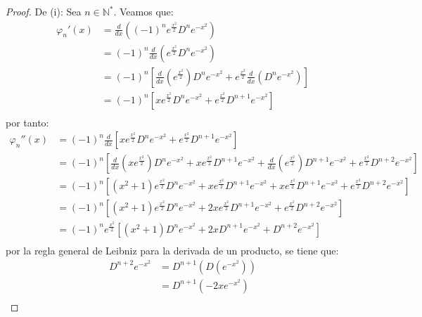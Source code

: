 \documentclass[12pt]{report}
\newcounter{it}
\theoremstyle{largebreak}
\begin{document}
    \begin{proof}
        De (i): Sea $n\in\mathbb{N}^*$. Veamos que:
        \begin{equation*}
            \begin{split}
                \varphi_n'(x)
                &=\frac{d}{dx}\left((-1)^ne^{\frac{x^2}{2}}D^ne^{-x^2} \right)\\
                &=(-1)^n\frac{d}{dx}\left(e^{\frac{x^2}{2}}D^n e^{-x^2}\right)\\
                &=(-1)^n\left[\frac{d}{dx}\left(e^{\frac{x^2}{2}}\right)D^n e^{-x^2}+e^{\frac{x^2}{2}}\frac{d}{dx}\left(D^n e^{-x^2}\right)\right] \\
                &=(-1)^n\left[xe^{\frac{x^2}{2}}D^n e^{-x^2}+e^{\frac{x^2}{2}}D^{n+1 } e^{-x^2}\right] \\
            \end{split}
        \end{equation*}
        por tanto:
        \begin{equation*}
            \begin{split}
                \varphi_n''(x)
                &=(-1)^n\frac{d}{dx}\left[xe^{\frac{x^2}{2}}D^n e^{-x^2}+e^{\frac{x^2}{2}}D^{n+1 } e^{-x^2}\right] \\
                &=(-1)^n\left[\frac{d}{dx}(xe^{\frac{x^2}{2}})D^n e^{-x^2}+xe^{\frac{x^2}{2}}D^{n+1}e^{-x^2}+\frac{d}{dx}(e^{\frac{x^2}{2}})D^{n+1 } e^{-x^2}+e^{\frac{x^2}{2}}D^{n+2 } e^{-x^2}\right] \\
                &=(-1)^n\left[(x^2+1)e^{\frac{x^2}{2}}D^n e^{-x^2}+xe^{\frac{x^2}{2}}D^{n+1}e^{-x^2}+xe^{\frac{x^2}{2}}D^{n+1 } e^{-x^2}+e^{\frac{x^2}{2}}D^{n+2 } e^{-x^2}\right] \\
                &=(-1)^n\left[(x^2+1)e^{\frac{x^2}{2}}D^n e^{-x^2}+2xe^{\frac{x^2}{2}}D^{n+1}e^{-x^2}+e^{\frac{x^2}{2}}D^{n+2 } e^{-x^2}\right] \\
                &=(-1)^ne^{\frac{x^2}{2}}\left[(x^2+1)D^n e^{-x^2}+2xD^{n+1}e^{-x^2}+D^{n+2 } e^{-x^2}\right] \\
            \end{split}
        \end{equation*}
        por la regla general de Leibniz para la derivada de un producto, se tiene que:
        \begin{equation*}
            \begin{split}
                D^{n+2}e^{-x^2}&=D^{n+1}(D(e^{-x^2})) \\
                &=D^{n+1}(-2xe^{-x^2}) \\

\end{split}
\end{equation*}
\end{proof}
\end{document}
